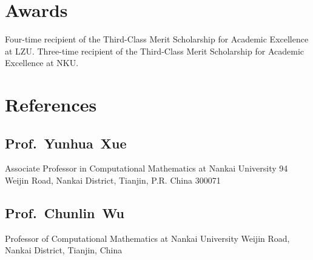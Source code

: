 \documentclass[11pt,a4paper, final]{moderncv}
\newcommand{\spacesubsection}{\vspace{0.2cm}}
\begin{document}
\section{\textbf{Awards}}
		{Four-time recipient of the Third-Class Merit Scholarship for Academic Excellence at LZU.}
		{Three-time recipient of the Third-Class Merit Scholarship for Academic Excellence at NKU.}
\section{\textbf{References}}
	\subsection{\textbf{Prof.~Yunhua~Xue}}
		\cvline{}
		{Associate Professor in Computational Mathematics at Nankai University}
		{94 Weijin Road, Nankai District, Tianjin, P.R. China 300071}
	\subsection{\textbf{Prof.~Chunlin~Wu}}
		\cvline{}
		{Professor of Computational Mathematics at Nankai University}
		{Weijin Road, Nankai District, Tianjin, China}
\end{document}

